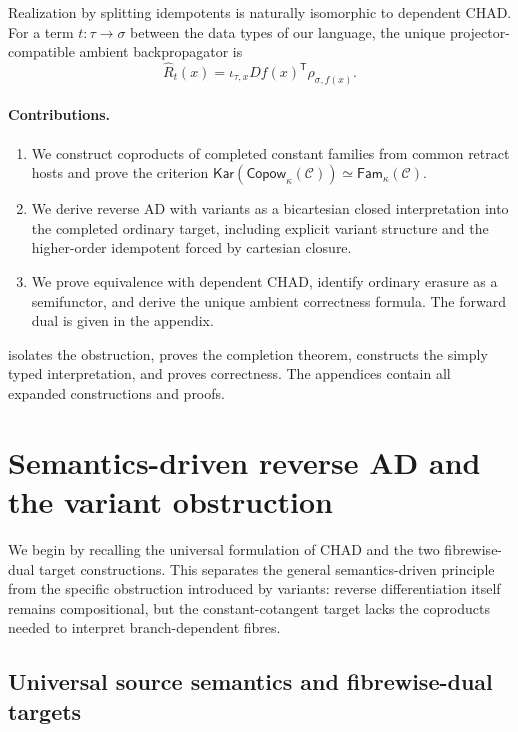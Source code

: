 \documentclass[runningheads,envcountsame]{llncs}
\newcommand{\Copow}{\mathsf{Copow}}
\newcommand{\Fam}{\mathsf{Fam}}
\newcommand{\Kar}{\mathsf{Kar}}
\begin{document}
Realization by splitting idempotents is naturally isomorphic to dependent CHAD.
For a term $t:\tau\to\sigma$ between the data types of our language, the unique
projector-compatible ambient backpropagator is
$$
\widehat R_t(x)=\iota_{\tau,x}Df(x)^{\mathsf T}\rho_{\sigma,f(x)}.
$$

\paragraph{Contributions.}
\begin{enumerate}
\item We construct coproducts of completed constant families from common
retract hosts and prove the criterion
$\Kar(\Copow_\kappa(\mathcal C))\simeq\Fam_\kappa(\mathcal C)$.
\item We derive reverse AD with variants as a bicartesian closed interpretation
into the completed ordinary target, including explicit variant structure and
the higher-order idempotent forced by cartesian closure.
\item We prove equivalence with dependent CHAD, identify ordinary erasure as a
semifunctor, and derive the unique ambient correctness formula. The forward
dual is given in the appendix.
\end{enumerate}

 isolates the obstruction,  proves the
completion theorem,  constructs the simply typed
interpretation, and  proves correctness. The appendices
contain all expanded constructions and proofs.

\section{Semantics-driven reverse AD and the variant obstruction}
\label{sec:basic}

We begin by recalling the universal formulation of CHAD and the two fibrewise-dual target constructions. This separates the general semantics-driven principle from the specific obstruction introduced by variants: reverse differentiation itself remains compositional, but the constant-cotangent target lacks the coproducts needed to interpret branch-dependent fibres.

\subsection{Universal source semantics and fibrewise-dual targets}
\end{document}
